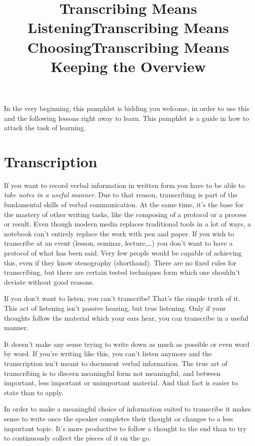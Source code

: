 \documentclass[../main.tex]{subfiles}
\begin{document}
In the very beginning, this pamphlet is bidding you welcome, in order to use this and the following lessons right away to learn.
This pamphlet is a guide in how to attack the task of learning.

\section{Transcription}
If you want to record verbal information in written form you have to be able to \emph{take notes in a useful manner}. Due to that reason, transcribing is part of the fundamental skills of verbal communication. At the same time, it's the base for the mastery of other writing tasks, like the composing of a protocol or a process or result.
Even though modern media replaces traditional tools in a lot of ways, a notebook can't entirely replace the work with pen and paper.
If you wish to transcribe at an event (lesson, seminar, lecture,\ldots ) you don't want to have a protocol of what has been said.
Very few people would be capable of achieving this, even if they know stenography (shorthand).
There are no fixed rules for transcribing, but there are certain tested techniques form which one shouldn't deviate without good reasons.

\title{Transcribing Means Listening}

If you don't want to listen, you can't transcribe! That's the simple truth of it. This act of listening isn't passive hearing, but {true listening}. Only if your thoughts follow the material which your ears hear, you can transcribe in a useful manner.


\title{Transcribing Means Choosing}

It doesn't make any sense trying to write down as much as possible or even word by word.
If you're writing like this, you can't listen anymore and the transcription isn't meant to document verbal information.
The true art of transcribing is to discern meaningful form not meaningful, and between important, less important or unimportant material.
And that fact is easier to state than to apply.

\title{Transcribing Means Keeping the Overview}
In order to make a meaningful choice of information suited to transcribe it makes sense to write once the speaker completes their thought or changes to a less important topic.
It's more productive to follow a thought to the end than to try to continuously collect the pieces of it on the go.
\end{document}
